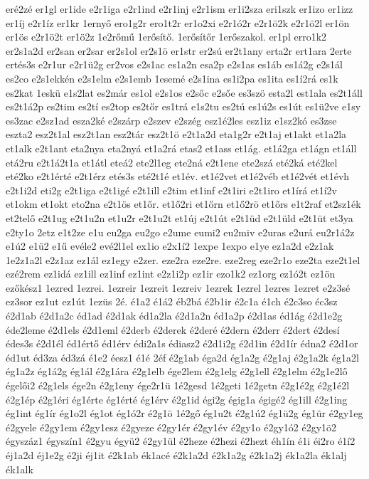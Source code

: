 {eré2zé
er1gl
er1ide
e2r1iga
e2r1ind
e2r1inj
e2r1ism
er1i2sza
eri1szk
er1izo
er1izz
er1íj
e2r1íz
er1kr
1ernyő
ero1g2r
ero1t2r
er1o2xi
e2r1ó2r
e2r1ö2k
e2r1ö2l
er1ön
er1ös
e2r1ö2t
er1ö2z
1e2rőmű
1erősítő.
1erősítőr
1erőszakol.
er1pl
erro1k2
er2s1a2d
er2san
er2sar
er2s1ol
er2s1ö
er1str
er2sú
er2t1any
erta2r
ert1ara
2erte
ertés3s
e2r1ur
e2r1ü2g
er2vos
e2s1ac
es1a2n
esa2p
e2s1as
es1áb
es1á2g
e2s1ál
es2co
e2s1ekkén
e2s1elm
e2s1emb
1esemé
e2s1ina
es1i2pa
es1ita
es1í2rá
es1k
es2kat
1eskü
e1s2lat
es2már
es1ol
e2s1os
e2sőc
e2sőe
es3szö
esta2l
est1ala
es2t1áll
es2t1á2p
es2tim
es2tí
es2top
es2tőr
es1trá
e1s2tu
es2tú
es1ú2s
es1út
es1ü2ve
e1sy
es3zac
e2sz1ad
esza2ké
e2szárp
e2szev
e2szég
esz1é2les
esz1iz
e1sz2kó
es3zse
eszta2
esz2t1al
esz2t1an
esz2tár
esz2t1ö
e2t1a2d
eta1g2r
e2t1aj
et1akt
et1a2la
et1alk
e2t1ant
eta2nya
eta2nyá
et1a2rá
etas2
et1ass
et1ág.
et1á2ga
et1ágn
et1áll
etá2ru
e2t1á2t1a
et1átl
eteá2
ete2l1eg
ete2ná
e2t1ene
ete2szá
eté2ká
eté2kel
eté2ko
e2t1érté
e2t1érz
etés3s
eté2t1é
et1év.
et1é2vet
et1é2véb
et1é2vét
et1évh
e2t1i2d
eti2g
e2t1iga
e2t1igé
e2t1ill
e2tim
et1inf
e2t1iri
e2t1iro
et1írá
et1í2v
et1okm
et1okt
eto2na
e2t1ös
et1őr.
et1ő2ri
et1őrn
et1ő2rö
et1őrs
e1t2raf
et2sz1ék
et2telő
e2t1ug
e2t1u2n
et1u2r
e2t1u2t
et1új
e2t1út
e2t1üd
e2t1üld
e2t1üt
et3ya
e2ty1o
2etz
e1t2ze
e1u
eu2ga
eu2go
e2ume
eumi2
eu2miv
e2uras
e2urá
eu2r1á2z
e1ú2
e1ü2
e1ű
evéle2
evé2l1el
ex1io
e2x1í2
1expe
1expo
e1ye
ez1a2d
e2z1ak
1e2z1a2l
e2z1az
ez1ál
ez1egy
e2zer.
eze2ra
eze2re.
eze2reg
eze2r1o
eze2ta
eze2t1el
ezé2rem
ez1idá
ez1ill
ez1inf
ez1int
e2z1i2p
ez1ir
ezo1k2
ez1org
ez1ó2t
ez1ön
ezőkész1
1ezred
1ezrei.
1ezreir
1ezreit
1ezreiv
1ezrek
1ezrel
1ezres
1ezret
e2z3sé
ez3sor
ez1ut
ez1út
1ezüs
2é.
é1a2
é1á2
éb2bá
é2b1ir
é2c1a
é1ch
é2c3so
éc3sz
é2d1ab
é2d1a2c
éd1ad
é2d1ak
éd1a2la
é2d1a2n
éd1a2p
é2d1as
éd1ág
é2d1e2g
éde2leme
é2d1els
é2d1eml
é2derb
é2derek
é2deré
é2dern
é2derr
é2dert
é2desí
édes3s
é2d1él
éd1értő
éd1érv
édi2a1s
édiasz2
é2d1i2g
é2d1in
é2d1ír
édna2
é2d1or
éd1ut
éd3za
éd3zá
é1e2
éesz1
é1é
2éf
é2g1ab
éga2d
ég1a2g
é2g1aj
é2g1a2k
ég1a2l
ég1a2z
ég1á2g
ég1ál
é2g1ára
é2g1elb
ége2lem
é2g1elg
é2g1ell
é2g1elm
é2g1e2lő
égelői2
é2g1els
ége2n
é2g1eny
ége2r1ü
1é2gesd
1é2geti
1é2getn
é2g1é2g
é2g1é2l
é2g1ép
é2g1éri
ég1érte
ég1érté
ég1érv
é2g1id
égi2g
égig1a
égigé2
ég1ill
é2g1ing
ég1int
ég1ír
ég1o2l
ég1ot
ég1ó2r
é2g1ö
1é2gő
ég1u2t
é2g1ú2
ég1ü2g
ég1ür
é2gy1eg
é2gyele
é2gy1em
é2gy1esz
é2gyeze
é2gy1ér
é2gy1év
é2gy1o
é2gy1ó2
é2gy1ö2
égyszáz1
égyszín1
é2gyu
égyü2
é2gy1ül
é2heze
é2hezi
é2hezt
éh1ín
é1i
éi2ro
é1í2
éj1a2d
éj1e2g
é2ji
éj1it
é2k1ab
ék1acé
é2k1a2d
é2k1a2g
é2k1a2j
ék1a2la
ék1alj
ék1alk
}
